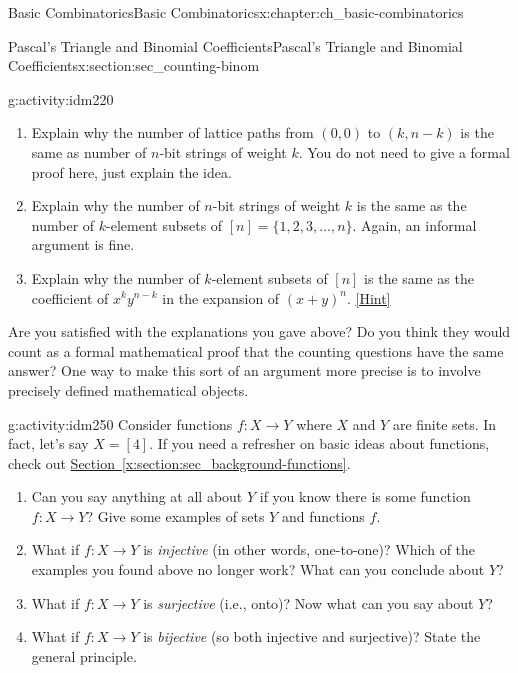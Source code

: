 \documentclass[oneside,10pt,]{book}
\numberwithin{equation}{chapter}
\begin{document}
\begin{chapterptx}{Basic Combinatorics}{}{Basic Combinatorics}{}{}{x:chapter:ch_basic-combinatorics}
\begin{sectionptx}{Pascal's Triangle and Binomial Coefficients}{}{Pascal's Triangle and Binomial Coefficients}{}{}{x:section:sec_counting-binom}
\begin{activity}{}{g:activity:idm220}%
\begin{enumerate}[font=\bfseries,label=(\alph*),ref=\alph*]
\item{}Explain why the number of lattice paths from \((0,0)\) to \((k,n-k)\) is the same as number of \(n\)-bit strings of weight \(k\). You do not need to give a formal proof here, just explain the idea.%
\item{}Explain why the number of \(n\)-bit strings of weight \(k\) is the same as the number of \(k\)-element subsets of \([n] = \{1,2,3,\ldots, n\}\).   Again, an informal argument is fine.%
\item{}Explain why the number of \(k\)-element subsets of \([n]\) is the same as the coefficient of \(x^ky^{n-k}\) in the expansion of \((x+y)^n\).%
\space\hspace*{0pt}\hfill{\tiny\hyperlink{g:hint:idm240-back}{[Hint]}}\end{enumerate}
\end{activity}
Are you satisfied with the explanations you gave above?  Do you think they would count as a formal mathematical proof that the counting questions have the same answer?  One way to make this sort of an argument more precise is to involve precisely defined mathematical objects.%
\begin{activity}{}{g:activity:idm250}%
Consider functions \(f:X \to Y\) where \(X\) and \(Y\) are finite sets.  In fact, let's say \(X = [4]\). If you need a refresher on basic ideas about functions, check out \hyperref[x:section:sec_background-functions]{Section~\ref{x:section:sec_background-functions}}.%
\begin{enumerate}[font=\bfseries,label=(\alph*),ref=\alph*]
\item{}Can you say anything at all about \(Y\) if you know there is some function \(f:X \to Y\)?  Give some examples of sets \(Y\) and functions \(f\).%
\item{}What if \(f:X \to Y\) is \emph{injective} (in other words, one-to-one)?  Which of the examples you found above no longer work?  What can you conclude about \(Y\)?%
\item{}What if \(f:X \to Y\) is \emph{surjective} (i.e., onto)?  Now what can you say about \(Y\)?%
\item{}What if \(f:X\to Y\) is \emph{bijective} (so both injective and surjective)?  State the general principle.%
\end{enumerate}
\end{activity}

\end{sectionptx}
\end{chapterptx}
\end{document}
